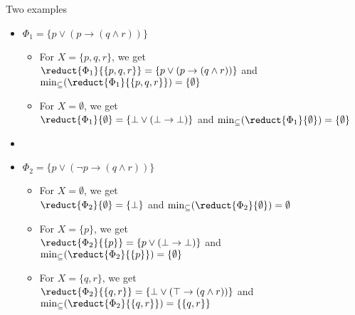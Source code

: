 \begin{frame}{Two examples}
  \begin{itemize}
  \item
    \(
    \Phi_1=\{p\vee(p\rightarrow (q\wedge r))\}
    \)
    \begin{itemize}
    \item <2-> For $X=\{p,q,r\}$, we get\\
      \(
      \reduct{\Phi_1}{\{p,q,r\}}=\{p\vee(p\rightarrow (q\wedge r))\}
      \)
      and
      \(
      \min_\subseteq(\reduct{\Phi_1}{\{p,q,r\}})=\{\emptyset\}
      \)
      \KO
    \item <4-> For $X=\emptyset$, we get\\
      \(
      \reduct{\Phi_1}{\emptyset}=\{\bot\vee(\bot\rightarrow \bot)\}
      \)
      and
      \(
      \min_\subseteq(\reduct{\Phi_1}{\emptyset})=\{\emptyset\}
      \)
      \OK
    \end{itemize}
  \item[]
  \item <6->
    \(
    \Phi_2=\{p\vee({\neg p}\rightarrow (q\wedge r))\}
    \)
    \begin{itemize}
    \item <7-> For $X=\emptyset$, we get\\
      \(
      \reduct{\Phi_2}{\emptyset}=\{\bot\}
      \)
      and
      \(
      \min_\subseteq(\reduct{\Phi_2}{\emptyset})=\emptyset
      \)
      \KO
    \item <9-> For $X=\{p\}$, we get\\
      \(
      \reduct{\Phi_2}{\{p\}}=\{p\vee(\bot\rightarrow \bot)\}
      \)
      and
      \(
      \min_\subseteq(\reduct{\Phi_2}{\{p\}})=\{\emptyset\}
      \)
      \KO
    \item <11-> For $X=\{q,r\}$, we get\\
      \(
      \reduct{\Phi_2}{\{q,r\}}=\{\bot\vee(\top\rightarrow (q\wedge r))\}
      \)
      and
      \(
      \min_\subseteq(\reduct{\Phi_2}{\{q,r\}})=\{\{q,r\}\}
      \)
      \OK
    \end{itemize}
  \end{itemize}
\end{frame}

